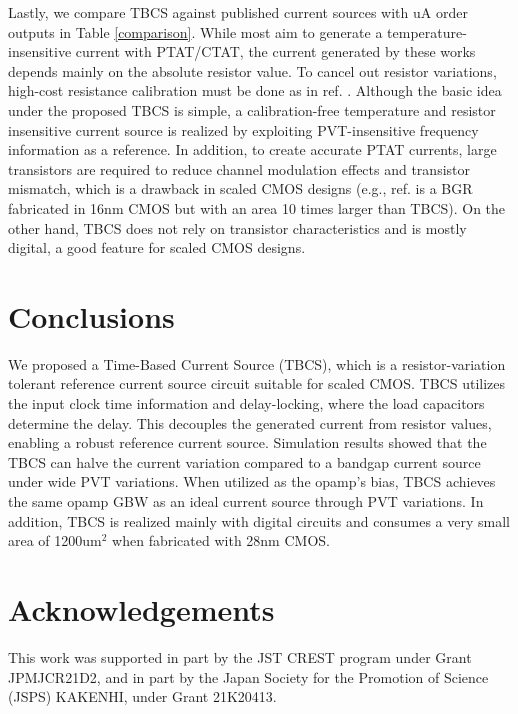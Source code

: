 \documentclass[paper]{ieice}
\begin{document}
Lastly, we compare TBCS against published current sources with uA order outputs in Table \ref{comparison}. While most aim to generate a temperature-insensitive current with PTAT/CTAT, the current generated by these works depends mainly on the absolute resistor value. To cancel out resistor variations, high-cost resistance calibration must be done as in ref. \cite{osipov2016temperature}. Although the basic idea under the proposed TBCS is simple, a calibration-free temperature and resistor insensitive current source is realized by exploiting PVT-insensitive frequency information as a reference. In addition, to create accurate PTAT currents, large transistors are required to reduce channel modulation effects and transistor mismatch, which is a drawback in scaled CMOS designs (e.g., ref. \cite{wadhwa2017high} is a BGR fabricated in 16nm CMOS but with an area 10 times larger than TBCS). On the other hand, TBCS does not rely on transistor characteristics and is mostly digital, a good feature for scaled CMOS designs.

\section{Conclusions}
\qquad We proposed a Time-Based Current Source (TBCS), which is a resistor-variation tolerant reference current source circuit suitable for scaled CMOS. TBCS utilizes the input clock time information and delay-locking, where the load capacitors determine the delay. This decouples the generated current from resistor values, enabling a robust reference current source.  Simulation results showed that the TBCS can halve the current variation compared to a bandgap current source under wide PVT variations. When utilized as the opamp's bias, TBCS achieves the same opamp GBW as an ideal current source through PVT variations. In addition, TBCS is realized mainly with digital circuits and consumes a very small area of 1200um$^2$ when fabricated with 28nm CMOS.

\section*{Acknowledgements}
This work was supported in part by the JST CREST program under Grant JPMJCR21D2, and in part by the Japan Society for the Promotion of Science (JSPS) KAKENHI, under Grant 21K20413.




\label{profile}
\end{document}
